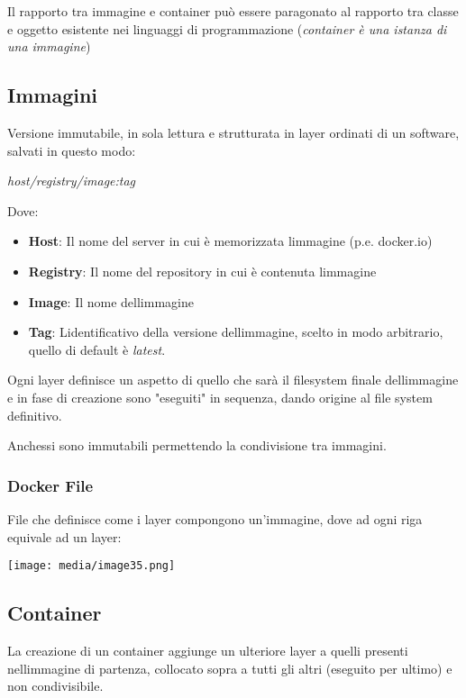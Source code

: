 Il rapporto tra immagine e container può essere paragonato al rapporto
tra classe e oggetto esistente nei linguaggi di programmazione
(\emph{container è una istanza di una immagine})

\subsection{Immagini}\label{immagini}

Versione immutabile, in sola lettura e strutturata in layer ordinati di
un software, salvati in questo modo:

\emph{host/registry/image:tag}

Dove:

\begin{itemize}
\item
  \textbf{Host}: Il nome del server in cui è memorizzata
  l\textquotesingle immagine (p.e. docker.io)
\item
  \textbf{Registry}: Il nome del repository in cui è contenuta
  l\textquotesingle immagine
\item
  \textbf{Image}: Il nome dell\textquotesingle immagine
\item
  \textbf{Tag}: L\textquotesingle identificativo della versione
  dell\textquotesingle immagine, scelto in modo arbitrario, quello di
  default è \emph{latest}.
\end{itemize}

Ogni layer definisce un aspetto di quello che sarà il filesystem finale
dell\textquotesingle immagine e in fase di creazione sono "eseguiti" in
sequenza, dando origine al file system definitivo.

Anch\textquotesingle essi sono immutabili permettendo la condivisione
tra immagini.

\subsubsection{Docker File}\label{docker-file}

File che definisce come i layer compongono un'immagine, dove ad ogni
riga equivale ad un layer:

\texttt{[image: media/image35.png]}

\subsection{Container}\label{container}

La creazione di un container aggiunge un ulteriore layer a quelli
presenti nell\textquotesingle immagine di partenza, collocato sopra a
tutti gli altri (eseguito per ultimo) e non condivisibile.

